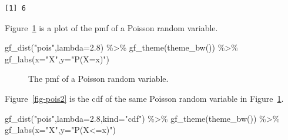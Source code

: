 \documentclass[
  letterpaper,
  DIV=11,
  numbers=noendperiod]{scrreprt}
\newenvironment{Shaded}{\begin{snugshade}}{\end{snugshade}}
\newcommand{\AttributeTok}[1]{\textcolor[rgb]{0.40,0.45,0.13}{#1}}
\newcommand{\FloatTok}[1]{\textcolor[rgb]{0.68,0.00,0.00}{#1}}
\newcommand{\FunctionTok}[1]{\textcolor[rgb]{0.28,0.35,0.67}{#1}}
\newcommand{\NormalTok}[1]{\textcolor[rgb]{0.00,0.23,0.31}{#1}}
\newcommand{\SpecialCharTok}[1]{\textcolor[rgb]{0.37,0.37,0.37}{#1}}
\newcommand{\StringTok}[1]{\textcolor[rgb]{0.13,0.47,0.30}{#1}}
\begin{document}
\begin{verbatim}
[1] 6
\end{verbatim}

Figure~\ref{fig-pois} is a plot of the pmf of a Poisson random variable.

\begin{Shaded}
\begin{Highlighting}[]
\FunctionTok{gf\_dist}\NormalTok{(}\StringTok{"pois"}\NormalTok{,}\AttributeTok{lambda=}\FloatTok{2.8}\NormalTok{) }\SpecialCharTok{\%\textgreater{}\%}
  \FunctionTok{gf\_theme}\NormalTok{(}\FunctionTok{theme\_bw}\NormalTok{()) }\SpecialCharTok{\%\textgreater{}\%}
  \FunctionTok{gf\_labs}\NormalTok{(}\AttributeTok{x=}\StringTok{"X"}\NormalTok{,}\AttributeTok{y=}\StringTok{"P(X=x)"}\NormalTok{)}
\end{Highlighting}
\end{Shaded}

\begin{figure}[H]


\caption{\label{fig-pois}The pmf of a Poisson random variable.}

\end{figure}%

Figure~\ref{fig-pois2} is the cdf of the same Poisson random variable in
Figure~\ref{fig-pois}.

\begin{Shaded}
\begin{Highlighting}[]
\FunctionTok{gf\_dist}\NormalTok{(}\StringTok{"pois"}\NormalTok{,}\AttributeTok{lambda=}\FloatTok{2.8}\NormalTok{,}\AttributeTok{kind=}\StringTok{"cdf"}\NormalTok{) }\SpecialCharTok{\%\textgreater{}\%}
  \FunctionTok{gf\_theme}\NormalTok{(}\FunctionTok{theme\_bw}\NormalTok{()) }\SpecialCharTok{\%\textgreater{}\%}
  \FunctionTok{gf\_labs}\NormalTok{(}\AttributeTok{x=}\StringTok{"X"}\NormalTok{,}\AttributeTok{y=}\StringTok{"P(X\textless{}=x)"}\NormalTok{)}
\end{Highlighting}
\end{Shaded}
\end{document}
